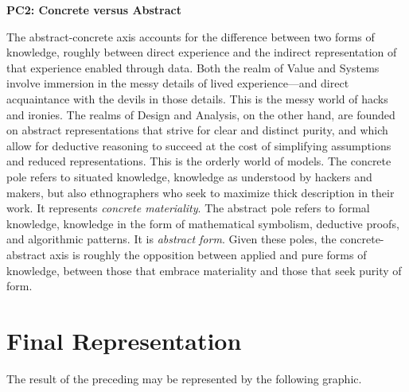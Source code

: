 \documentclass[
  letterpaper,
]{report}
\begin{document}
\textbf{PC2: Concrete versus Abstract}

The abstract-concrete axis accounts for the difference between two forms
of knowledge, roughly between direct experience and the indirect
representation of that experience enabled through data. Both the realm
of Value and Systems involve immersion in the messy details of lived
experience---and direct acquaintance with the devils in those details.
This is the messy world of hacks and ironies. The realms of Design and
Analysis, on the other hand, are founded on abstract representations
that strive for clear and distinct purity, and which allow for deductive
reasoning to succeed at the cost of simplifying assumptions and reduced
representations. This is the orderly world of models. The concrete pole
refers to situated knowledge, knowledge as understood by hackers and
makers, but also ethnographers who seek to maximize thick description in
their work. It represents \emph{concrete materiality}. The abstract pole
refers to formal knowledge, knowledge in the form of mathematical
symbolism, deductive proofs, and algorithmic patterns. It is
\emph{abstract form}. Given these poles, the concrete-abstract axis is
roughly the opposition between applied and pure forms of knowledge,
between those that embrace materiality and those that seek purity of
form.

\hypertarget{final-representation}{%
\chapter{Final Representation}\label{final-representation}}

The result of the preceding may be represented by the following graphic.
\end{document}
